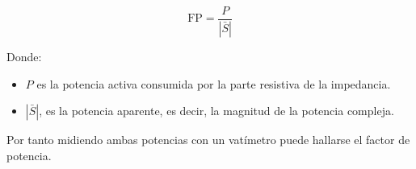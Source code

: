 \documentclass[letter,11pt]{article}
\begin{document}
\begin{enumerate}
\begin{equation*}
    \text{FP} = \frac{P}{|\bar{S}|}
\end{equation*}

Donde:
\begin{itemize}
    \item \textbf{$P$} es la potencia activa consumida por la parte resistiva de
        la impedancia.
    \item \textbf{$|\bar{S}|$}, es la potencia aparente, es decir, la magnitud
        de la potencia compleja.
\end{itemize}

Por tanto midiendo ambas potencias con un vatímetro puede hallarse el factor de
potencia.

\end{enumerate}
\end{document}

